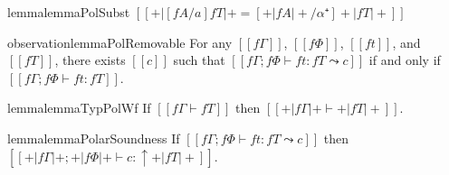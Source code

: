 \begin{restatable}{lemma}{lemmaPolSubst}
  \label{lemma:pol-subst}
  $[[ +|[fA/a]fT|+ = [+|fA|+ / α⁺] +|fT|+ ]]$
\end{restatable}


\begin{restatable}{observation}{lemmaPolRemovable}
  \label{lemma:pol-removable}
  For any $[[fΓ]]$, $[[fΦ]]$, $[[ft]]$, and $[[fT]]$,
  there exists $[[c]]$ such that $[[fΓ ; fΦ ⊢ ft : fT ⤳ c]]$
  if and only if $[[fΓ ; fΦ ⊢ ft : fT]]$.
\end{restatable}

\begin{restatable}{lemma}{lemmaTypPolWf}
  \label{lemma:typ-pol-wf}
  If $[[fΓ ⊢ fT]]$ then $[[+|fΓ|+ ⊢ +|fT|+]]$.
\end{restatable}

\begin{restatable}{lemma}{lemmaPolarSoundness}
  \label{lemma:polar-soundness}
  If $[[fΓ ; fΦ ⊢ ft : fT ⤳ c]]$
  then $[[+|fΓ|+ ; +|fΦ|+ ⊢ c : ↑+|fT|+]]$.
\end{restatable}



